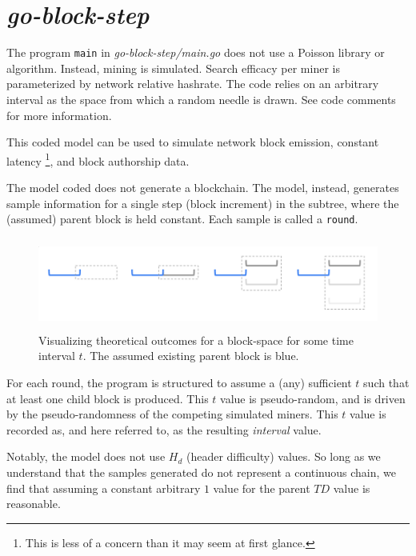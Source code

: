 \documentclass[11pt]{article}
\begin{document}

	\section{\normalsize{\textit{go-block-step}}}

	The program \texttt{main} in \textit{go-block-step/main.go} does not use
	a Poisson library or algorithm.
	Instead, mining is simulated.
	Search efficacy per miner is parameterized by network relative hashrate.
	The code relies on an arbitrary interval as the space from which a random needle
	is drawn. See code comments for more information.

	This coded model can be used to simulate network block emission, constant latency\nolinebreak
	\footnote{This is less of a concern than it may seem at first glance.}, and
	block authorship data.

	The model coded does not generate a blockchain. The model, instead,
	generates sample information for a single step (block increment)
	in the subtree, where the (assumed) parent block is held constant.
	Each sample is called a \texttt{round}.

	\begin{figure}[tph]
		\centering
		\includegraphics[height=3cm]{vis_theoretical_block-space.png}
		\caption{
			Visualizing theoretical outcomes for a block-space for some time interval
			$t$. The assumed existing parent block is blue.
		}
	\end{figure}

	For each round, the program is structured to assume a (any) sufficient $t$ such
	that at least one child block is produced. This $t$ value is pseudo-random, and
	is driven by the pseudo-randomness of the competing simulated miners.
	This $t$ value is recorded as, and here referred to, as the resulting
	\textit{interval} value.

	Notably, the model does not use $H_d$ (header difficulty) values.
	So long as we understand that the samples generated do not represent a continuous
	chain, we find that assuming a constant arbitrary $1$ value for the
	parent $TD$ value is reasonable.
\end{document}
